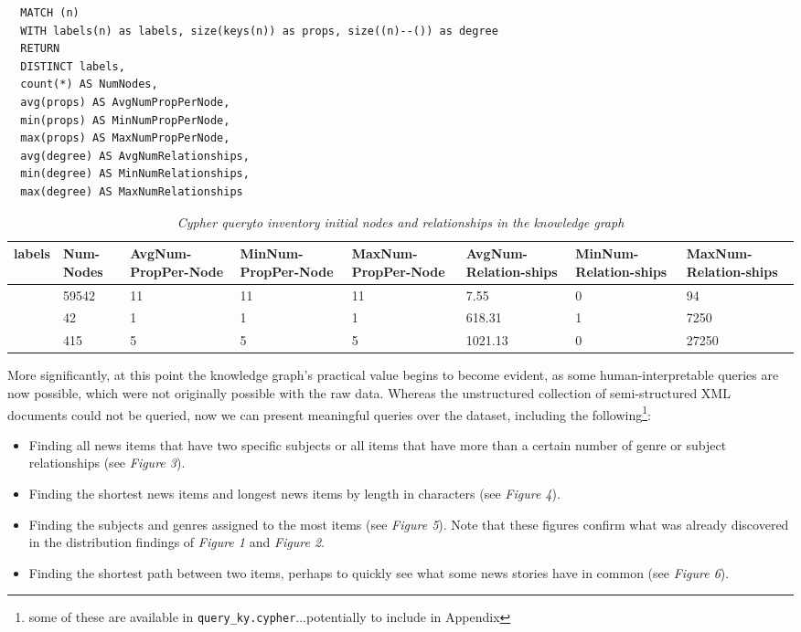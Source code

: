 \documentclass[11pt]{article}
\begin{document}
\begin{table}
  \begin{lstlisting}
  MATCH (n)
  WITH labels(n) as labels, size(keys(n)) as props, size((n)--()) as degree
  RETURN
  DISTINCT labels,
  count(*) AS NumNodes,
  avg(props) AS AvgNumPropPerNode,
  min(props) AS MinNumPropPerNode,
  max(props) AS MaxNumPropPerNode,
  avg(degree) AS AvgNumRelationships,
  min(degree) AS MinNumRelationships,
  max(degree) AS MaxNumRelationships
  \end{lstlisting}

  \begin{tabular}{ |p{2cm}|p{1cm}|p{1.5cm}|p{1.5cm}|p{1.5cm}|p{1.5cm}|p{1.5cm}|p{1.5cm}| }
  \hline
  labels&Num-Nodes&AvgNum-PropPer-Node&MinNum-PropPer-Node&MaxNum-PropPer-Node&AvgNum-Relation-ships&MinNum-Relation-ships&MaxNum-Relation-ships\\
  \hline
  [``NewsItem"]&59542&11&11&11&7.55&0&94\\
  \hline
  [``Genre"]&42&1&1&1&618.31&1&7250\\
  \hline
  [``Subject"]&415&5&5&5&1021.13&0&27250\\
  \hline
  \end{tabular}

  \caption{\textit{Cypher query\protect \footnotemark to inventory initial nodes and relationships in the knowledge graph}}
\end{table}



More significantly, at this point the knowledge graph's practical value begins to become evident, as some human-interpretable queries are now possible, which were not originally possible with the raw data. Whereas the unstructured collection of semi-structured XML documents could not be queried, now we can present meaningful queries over the dataset, including the following\footnote{some of these are available in \lstinline{query_ky.cypher}...potentially to include in Appendix}:

\begin{itemize}
  \item{Finding all news items that have two specific subjects or all items that have more than a certain number of genre or subject relationships (see \textit{Figure 3}).}
  \item{Finding the shortest news items and longest news items by length in characters (see \textit{Figure 4}).}
  \item{Finding the subjects and genres assigned to the most items (see \textit{Figure 5}). Note that these figures confirm what was already discovered in the distribution findings of \textit{Figure 1} and \textit{Figure 2}.}
  \item{Finding the shortest path between two items, perhaps to quickly see what some news stories have in common (see \textit{Figure 6}).}
\end{itemize}
\end{document}
